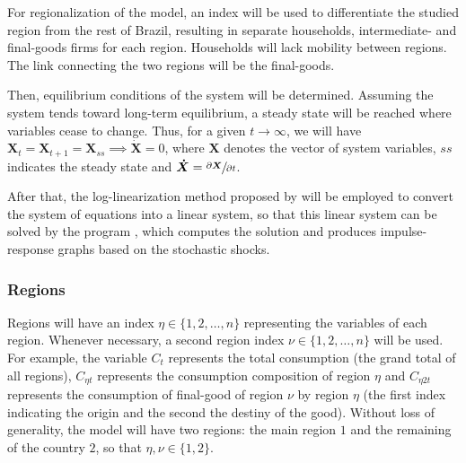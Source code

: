 \documentclass[
thesis.tex
]{subfiles}
\begin{document}
	For regionalization of the model, an index will be used to differentiate the studied region from the rest of Brazil, resulting in separate households, intermediate- and final-goods firms for each region. Households will lack mobility between regions. The link connecting the two regions will be the final-goods.
	
	Then, equilibrium conditions of the system will be determined. Assuming the system tends toward long-term equilibrium, a steady state will be reached where variables cease to change. Thus, for a given $t \longrightarrow \infty$, we will have $\boldsymbol{X}_t = \boldsymbol{X}_{t+1} = \boldsymbol{X}_{ss} \implies \boldsymbol{\dot{X}} = 0$, where $\boldsymbol{X}$ denotes the vector of system variables, $ss$ indicates the steady state and $\boldsymbol{\dot{X}} = \sfrac{\partial \boldsymbol{X}}{\partial t}$. 
	
	After that, the log-linearization method proposed by \textcite{uhlig_toolkit_1999} will be employed to convert the system of equations into a linear system, so that this linear system can be solved by the program \dynare{}, which computes the solution and produces impulse-response graphs based on the stochastic shocks.

	
\subsubsection*{Regions}\label{sec:regions}

	
	
	Regions will have an index $\eta \in \{1,2,\ldots,n\}$ representing the variables of each region. Whenever necessary, a second region index $\nu \in \{1,2,\ldots,n\}$ will be used. For example, the variable $C_{t}$ represents the total consumption (the grand total of all regions), $C_{\eta t}$ represents the consumption composition of region $\eta$ and $C_{\eta 2 t}$ represents the consumption of final-good of region $\nu$ by region $\eta$ (the first index indicating the origin and the second the destiny of the good). Without loss of generality, the model will have two regions: the main region $1$ and the remaining of the country $2$, so that $\eta,\nu \in \{1,2\}$.
\end{document}
